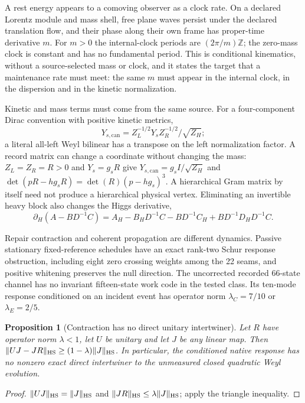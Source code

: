 \documentclass[11pt]{article}
\newtheorem{proposition}[theorem]{Proposition}
\begin{document}
A rest energy appears to a comoving observer as a clock rate. On a declared
Lorentz module and mass shell, free plane waves persist under the declared
translation flow, and their phase along their own frame has proper-time
derivative \(m\). For \(m>0\) the internal-clock periods are
\((2\pi/m)\mathbb Z\); the zero-mass clock is constant and has no fundamental
period. This is conditional kinematics, without a source-selected mass or
clock, and it states the target that a maintenance rate must meet: the same
\(m\) must appear in the internal clock, in the dispersion and in the
kinetic normalization.

Kinetic and mass terms must come from the same source. For a four-component
Dirac convention with positive kinetic metrics,
\[
 Y_{s,\mathrm{can}}=Z_L^{-1/2}Y_sZ_R^{-1/2}/\sqrt{Z_H};
\]
a literal all-left Weyl bilinear has a transpose on the left normalization
factor. A record matrix can change a coordinate without changing the mass:
\(Z_L=Z_R=R>0\) and \(Y_s=g_sR\) give \(Y_{s,\mathrm{can}}=g_sI/\sqrt{Z_H}\)
and \(\det(pR-hg_sR)=\det(R)(p-hg_s)^3\). A hierarchical Gram matrix by itself
need not produce a hierarchical physical vertex. Eliminating an invertible
heavy block also changes the Higgs derivative,
\[
 \partial_H(A-BD^{-1}C)=A_H-B_HD^{-1}C-BD^{-1}C_H+BD^{-1}D_HD^{-1}C .
\]

Repair contraction and coherent propagation are different dynamics. Passive
stationary fixed-reference schedules have an exact rank-two Schur response
obstruction, including eight zero crossing weights among the 22 seams, and
positive whitening preserves the null direction. The uncorrected recorded
66-state channel has no invariant fifteen-state work code in the tested
class. Its ten-mode response conditioned on an incident event has operator
norm \(\lambda_C=7/10\) or \(\lambda_E=2/5\).

\begin{proposition}[Contraction has no direct unitary intertwiner]
\label{prop:no-intertwiner}
Let \(R\) have operator norm \(\lambda<1\), let \(U\) be unitary and let \(J\)
be any linear map. Then
\(\|UJ-JR\|_{\rm HS}\ge(1-\lambda)\|J\|_{\rm HS}\). In particular, the
conditioned native response has no nonzero exact direct intertwiner to the
unmeasured closed quadratic Weyl evolution.
\end{proposition}

\begin{proof}
\(\|UJ\|_{\rm HS}=\|J\|_{\rm HS}\) and
\(\|JR\|_{\rm HS}\le\lambda\|J\|_{\rm HS}\); apply the triangle inequality.
\end{proof}
\end{document}
